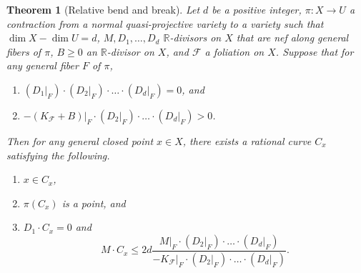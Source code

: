 \documentclass[11pt]{amsart}
\numberwithin{equation}{section}
\newcommand{\Rr}{\mathbb{R}}
\newcommand{\Ff}{\mathcal{F}}
\newtheorem{thm}{Theorem}[subsection]
\theoremstyle{definition}
\theoremstyle{definition}
\theoremstyle{definition}
\begin{document}
\begin{thm}[Relative bend and break]\label{thm: relative bb}
Let $d$ be a positive integer, $\pi: X\rightarrow U$ a contraction from a normal quasi-projective variety to a variety such that $\dim X-\dim U=d$, $M,D_1,\dots,D_d$ $\Rr$-divisors on $X$ that are nef along general fibers of $\pi$, $B\geq 0$ an $\Rr$-divisor on $X$, and $\Ff$ a foliation on $X$. Suppose that for any general fiber $F$ of $\pi$,
\begin{enumerate}
    \item $(D_1|_F)\cdot (D_2|_F)\cdot\dots\cdot (D_d|_F)=0$, and
    \item $-(K_{\Ff}+B)|_F\cdot (D_2|_F)\cdot\dots\cdot (D_d|_F)>0$.
\end{enumerate}
Then for any general closed point $x\in X$, there exists a rational curve $C_x$ satisfying the following.
\begin{enumerate}
    \item $x\in C_x$, 
    \item $\pi(C_x)$ is a point, and
    \item $D_1\cdot C_x=0$ and
    $$M\cdot C_x\leq 2d\frac{M|_F\cdot  (D_2|_F)\cdot\dots\cdot (D_d|_F)}{-K_{\Ff}|_F\cdot  (D_2|_F)\cdot\dots\cdot (D_d|_F)}.$$
\end{enumerate}
\end{thm}
\end{document}
